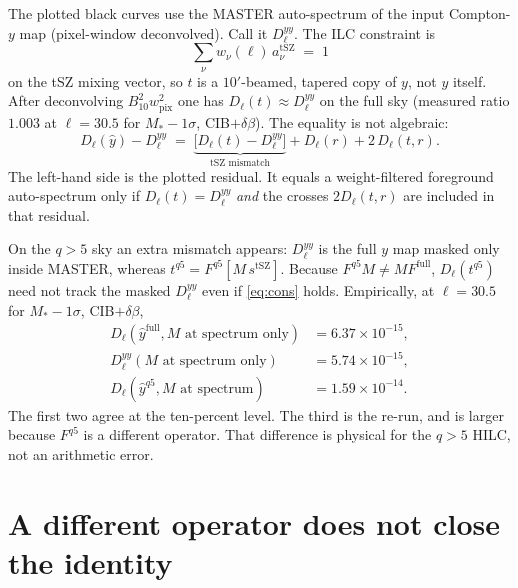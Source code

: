 \documentclass[11pt,a4paper]{article}
\begin{document}
The plotted black curves use the MASTER auto-spectrum of the input
Compton-\(y\) map (pixel-window deconvolved). Call it \(D_\ell^{yy}\).
The ILC constraint is
\begin{equation}
  \sum_\nu w_\nu(\ell)\, a_\nu^{\mathrm{tSZ}} \;=\; 1
  \label{eq:cons}
\end{equation}
on the tSZ mixing vector, so \(t\) is a \(10'\)-beamed, tapered copy of \(y\),
not \(y\) itself. After deconvolving \(B_{10}^2 w_{\mathrm{pix}}^2\) one has
\(D_\ell(t)\approx D_\ell^{yy}\) on the full sky (measured ratio \(1.003\) at
\(\ell=30.5\) for \(M_\ast-1\sigma\), CIB\(+\delta\beta\)). The equality is
not algebraic:
\begin{equation}
  D_\ell(\hat y) - D_\ell^{yy}
  \;=\;
  \underbrace{\bigl[D_\ell(t)-D_\ell^{yy}\bigr]}_{\text{tSZ mismatch}}
  + D_\ell(r) + 2\, D_\ell(t,r).
  \label{eq:plot}
\end{equation}
The left-hand side is the plotted residual. It equals a weight-filtered
foreground auto-spectrum only if \(D_\ell(t)=D_\ell^{yy}\) \emph{and} the
crosses \(2D_\ell(t,r)\) are included in that residual.

On the \(q>5\) sky an extra mismatch appears: \(D_\ell^{yy}\) is the full \(y\)
map masked only inside MASTER, whereas \(t^{q5}=F^{q5}[M\,s^{\mathrm{tSZ}}]\).
Because \(F^{q5}M\neq M F^{\mathrm{full}}\),
\(D_\ell(t^{q5})\) need not track the masked \(D_\ell^{yy}\) even if
\eqref{eq:cons} holds. Empirically, at \(\ell=30.5\) for \(M_\ast-1\sigma\),
CIB\(+\delta\beta\),
\begin{align*}
  D_\ell(\hat y^{\mathrm{full}}, M\text{ at spectrum only})
  &= 6.37\times 10^{-15},\\
  D_\ell^{yy}(M\text{ at spectrum only})
  &= 5.74\times 10^{-15},\\
  D_\ell(\hat y^{q5}, M\text{ at spectrum})
  &= 1.59\times 10^{-14}.
\end{align*}
The first two agree at the ten-percent level. The third is the re-run, and
is larger because \(F^{q5}\) is a different operator. That difference is
physical for the \(q>5\) HILC, not an arithmetic error.

\section{A different operator does not close the identity}
\end{document}
